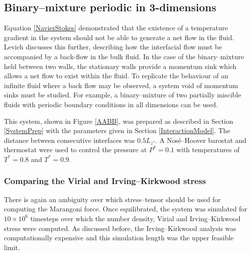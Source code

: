 \FloatBarrier
\subsection{Binary--mixture periodic in 3-dimensions}
Equation \ref{NavierStokes} demonstrated that the existence of a temperature gradient in the system should not be able to generate a net flow in the fluid. 
Levich discusses this further, describing how the interfacial flow must be accompanied by a back-flow in the bulk fluid.\cite{Levich}
In the case of the binary--mixture held between two walls, the stationary walls provide a momentum sink which allows a net flow to exist within the fluid.
To replicate the behaviour of an infinite fluid where a back flow may be observed, a system void of momentum sinks must be studied.
For example, a binary--mixture of two partially miscible fluids with periodic boundary conditions in all dimensions can be used.

This system, shown in Figure \ref{AABB}, was prepared as described in Section \ref{SystemPrep} with the parameters given in Section \ref{InteractionModel}.
The distance between consecutive interfaces was $0.5 L_{z^{*}}$.
A Nos\'{e}--Hoover barostat and thermostat were used to control the pressure at $P^{*} = 0.1$ with temperatures of $T^{*}=0.8$ and $T^{*}=0.9$.

\subsubsection{Comparing the Virial and Irving--Kirkwood stress}
There is again an ambiguity over which stress--tensor should be used for computing the Marangoni force.
Once equilibrated, the system was simulated for $10 \times 10^{6}$ timesteps over which the number density, Virial and Irving--Kirkwood stress were computed.
As discussed before, the Irving--Kirkwood analysis was computationally expensive and this simulation length was the upper feasible limit.
\FloatBarrier

